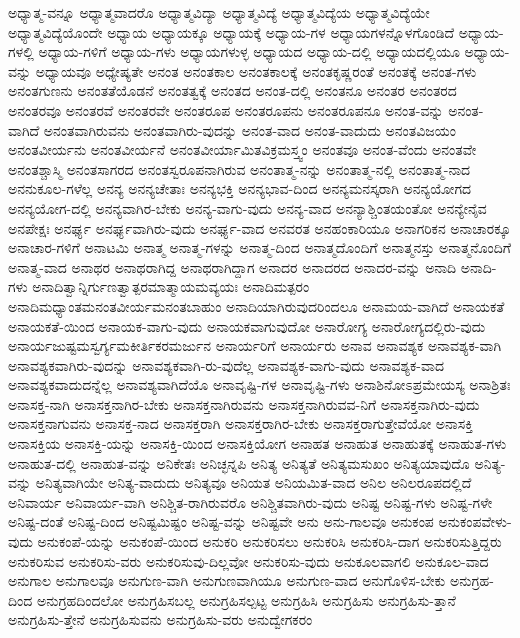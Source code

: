 {ಅಧ್ಯಾತ್ಮ-ವನ್ನೂ
ಅಧ್ಯಾತ್ಮವಾದರೊ
ಅಧ್ಯಾತ್ಮವಿದ್ಯಾ
ಅಧ್ಯಾತ್ಮವಿದ್ಯೆ
ಅಧ್ಯಾತ್ಮವಿದ್ಯೆಯ
ಅಧ್ಯಾತ್ಮವಿದ್ಯೆಯೇ
ಅಧ್ಯಾತ್ಮವಿದ್ಯೆಯೊಂದೇ
ಅಧ್ಯಾಯ
ಅಧ್ಯಾಯಕ್ಕೂ
ಅಧ್ಯಾಯಕ್ಕೆ
ಅಧ್ಯಾಯ-ಗಳ
ಅಧ್ಯಾಯಗಳನ್ನೊಳಗೊಂಡಿದೆ
ಅಧ್ಯಾಯ-ಗಳಲ್ಲಿ
ಅಧ್ಯಾಯ-ಗಳಿಗೆ
ಅಧ್ಯಾಯ-ಗಳು
ಅಧ್ಯಾಯಗಳುಳ್ಳ
ಅಧ್ಯಾಯದ
ಅಧ್ಯಾಯ-ದಲ್ಲಿ
ಅಧ್ಯಾಯದಲ್ಲಿಯೂ
ಅಧ್ಯಾಯ-ವನ್ನು
ಅಧ್ಯಾಯವೂ
ಅಧ್ಯೇಷ್ಯತೇ
ಅನಂತ
ಅನಂತಕಾಲ
ಅನಂತಕಾಲಕ್ಕೆ
ಅನಂತಕೃಷ್ಣರಂತೆ
ಅನಂತಕ್ಕೆ
ಅನಂತ-ಗಳು
ಅನಂತಗುಣನು
ಅನಂತತೆಯೊಡನೆ
ಅನಂತತ್ವಕ್ಕೆ
ಅನಂತದ
ಅನಂತ-ದಲ್ಲಿ
ಅನಂತನೂ
ಅನಂತರ
ಅನಂತರದ
ಅನಂತರವೂ
ಅನಂತರವೆ
ಅನಂತರವೇ
ಅನಂತರೂಪ
ಅನಂತರೂಪನು
ಅನಂತರೂಪನೂ
ಅನಂತ-ವನ್ನು
ಅನಂತ-ವಾಗಿದೆ
ಅನಂತವಾಗಿರುವನು
ಅನಂತವಾಗಿರು-ವುದನ್ನು
ಅನಂತ-ವಾದ
ಅನಂತ-ವಾದುದು
ಅನಂತವಿಜಯಂ
ಅನಂತವೀರ್ಯನು
ಅನಂತವೀರ್ಯನೆ
ಅನಂತವೀರ್ಯಾಮಿತವಿಕ್ರಮಸ್ತ್ವಂ
ಅನಂತವೂ
ಅನಂತ-ವೆಂದು
ಅನಂತವೇ
ಅನಂತಶ್ಚಾಸ್ಮಿ
ಅನಂತಸಾಗರದ
ಅನಂತಸ್ವರೂಪನಾಗಿರುವ
ಅನಂತಾತ್ಮ-ನನ್ನು
ಅನಂತಾತ್ಮ-ನಲ್ಲಿ
ಅನಂತಾತ್ಮ-ನಾದ
ಅನನುಕೂಲ-ಗಳೆಲ್ಲ
ಅನನ್ಯ
ಅನನ್ಯಚೇತಾಃ
ಅನನ್ಯಭಕ್ತಿ
ಅನನ್ಯಭಾವ-ದಿಂದ
ಅನನ್ಯಮನಸ್ಕರಾಗಿ
ಅನನ್ಯಯೋಗದ
ಅನನ್ಯಯೋಗ-ದಲ್ಲಿ
ಅನನ್ಯವಾಗಿರ-ಬೇಕು
ಅನನ್ಯ-ವಾಗು-ವುದು
ಅನನ್ಯ-ವಾದ
ಅನನ್ಯಾಶ್ಚಿಂತಯಂತೋ
ಅನನ್ಯೇನೈವ
ಅನಪೇಕ್ಷಃ
ಅನರ್ಘ್ಯ
ಅನರ್ಘ್ಯವಾಗಿರು-ವುದು
ಅನರ್ಘ್ಯ-ವಾದ
ಅನವರತ
ಅನಹಂಕಾರಿಯೂ
ಅನಾಗರಿಕನ
ಅನಾಚಾರಕ್ಕೂ
ಅನಾಚಾರ-ಗಳಿಗೆ
ಅನಾಟಮಿ
ಅನಾತ್ಮ
ಅನಾತ್ಮ-ಗಳನ್ನು
ಅನಾತ್ಮ-ದಿಂದ
ಅನಾತ್ಮದೊಂದಿಗೆ
ಅನಾತ್ಮನಸ್ತು
ಅನಾತ್ಮನೊಂದಿಗೆ
ಅನಾತ್ಮ-ವಾದ
ಅನಾಥರ
ಅನಾಥರಾಗಿದ್ದ
ಅನಾಥರಾಗಿದ್ದಾಗ
ಅನಾದರ
ಅನಾದರದ
ಅನಾದರ-ವನ್ನು
ಅನಾದಿ
ಅನಾದಿ-ಗಳು
ಅನಾದಿತ್ವಾನ್ನಿರ್ಗುಣತ್ವಾತ್ಪರಮಾತ್ಮಾಯಮವ್ಯಯಃ
ಅನಾದಿಮತ್ಪರಂ
ಅನಾದಿಮಧ್ಯಾಂತಮನಂತವೀರ್ಯಮನಂತಬಾಹುಂ
ಅನಾದಿಯಾಗಿರುವುದರಿಂದಲೂ
ಅನಾಮಯ-ವಾಗಿದೆ
ಅನಾಯಕತೆ
ಅನಾಯಕತೆ-ಯಿಂದ
ಅನಾಯಕ-ವಾಗು-ವುದು
ಅನಾಯಕವಾಗುವುದೋ
ಅನಾರೋಗ್ಯ
ಅನಾರೋಗ್ಯದಲ್ಲಿರು-ವುದು
ಅನಾರ್ಯಜುಷ್ಟಮಸ್ವರ್ಗ್ಯಮಕೀರ್ತಿಕರಮರ್ಜುನ
ಅನಾರ್ಯರಿಗೆ
ಅನಾರ್ಯರು
ಅನಾವ
ಅನಾವಶ್ಯಕ
ಅನಾವಶ್ಯಕ-ವಾಗಿ
ಅನಾವಶ್ಯಕವಾಗಿರು-ವುದನ್ನು
ಅನಾವಶ್ಯಕವಾಗಿ-ರು-ವುದೆಲ್ಲ
ಅನಾವಶ್ಯಕ-ವಾಗು-ವುದು
ಅನಾವಶ್ಯಕ-ವಾದ
ಅನಾವಶ್ಯಕವಾದುದನ್ನೆಲ್ಲ
ಅನಾವಶ್ಯವಾಗಿದೆಯೊ
ಅನಾವೃಷ್ಟಿ-ಗಳ
ಅನಾವೃಷ್ಟಿ-ಗಳು
ಅನಾಶಿನೋಽಪ್ರಮೇಯಸ್ಯ
ಅನಾಶ್ರಿತಃ
ಅನಾಸಕ್ತ-ನಾಗಿ
ಅನಾಸಕ್ತನಾಗಿರ-ಬೇಕು
ಅನಾಸಕ್ತನಾಗಿರುವನು
ಅನಾಸಕ್ತನಾಗಿರುವವ-ನಿಗೆ
ಅನಾಸಕ್ತನಾಗಿರು-ವುದು
ಅನಾಸಕ್ತನಾಗುವನು
ಅನಾಸಕ್ತ-ನಾದ
ಅನಾಸಕ್ತರಾಗಿ
ಅನಾಸಕ್ತರಾಗಿರ-ಬೇಕು
ಅನಾಸಕ್ತರಾಗುತ್ತೇವೆಯೋ
ಅನಾಸಕ್ತಿ
ಅನಾಸಕ್ತಿಯ
ಅನಾಸಕ್ತಿ-ಯನ್ನು
ಅನಾಸಕ್ತಿ-ಯಿಂದ
ಅನಾಸಕ್ತಿಯೋಗ
ಅನಾಹತ
ಅನಾಹುತ
ಅನಾಹುತಕ್ಕೆ
ಅನಾಹುತ-ಗಳು
ಅನಾಹುತ-ದಲ್ಲಿ
ಅನಾಹುತ-ವನ್ನು
ಅನಿಕೇತಃ
ಅನಿಚ್ಛನ್ನಪಿ
ಅನಿತ್ಯ
ಅನಿತ್ಯತೆ
ಅನಿತ್ಯಮಸುಖಂ
ಅನಿತ್ಯಯಾವುದೊ
ಅನಿತ್ಯ-ವನ್ನು
ಅನಿತ್ಯವಾಗಿಯೇ
ಅನಿತ್ಯ-ವಾದುದು
ಅನಿತ್ಯವೂ
ಅನಿಯತ
ಅನಿಯಮಿತ-ವಾದ
ಅನಿಲ
ಅನಿಲರೂಪದಲ್ಲಿದೆ
ಅನಿವಾರ್ಯ
ಅನಿವಾರ್ಯ-ವಾಗಿ
ಅನಿಶ್ಚಿತ-ರಾಗಿರುವರೊ
ಅನಿಶ್ಚಿತವಾಗಿರು-ವುದು
ಅನಿಷ್ಟ
ಅನಿಷ್ಟ-ಗಳು
ಅನಿಷ್ಟ-ಗಳೇ
ಅನಿಷ್ಟ-ದಂತೆ
ಅನಿಷ್ಟ-ದಿಂದ
ಅನಿಷ್ಟಮಿಷ್ಟಂ
ಅನಿಷ್ಟ-ವನ್ನು
ಅನಿಷ್ಟವೇ
ಅನು
ಅನು-ಗಾಲವೂ
ಅನುಕಂಪ
ಅನುಕಂಪವೇಳು-ವುದು
ಅನುಕಂಪೆ-ಯನ್ನು
ಅನುಕಂಪೆ-ಯಿಂದ
ಅನುಕರಿ
ಅನುಕರಿಸಲು
ಅನುಕರಿಸಿ
ಅನುಕರಿಸಿ-ದಾಗ
ಅನುಕರಿಸುತ್ತಿದ್ದರು
ಅನುಕರಿಸುವ
ಅನುಕರಿಸು-ವರು
ಅನುಕರಿಸುವು-ದಿಲ್ಲವೋ
ಅನುಕರಿಸು-ವುದು
ಅನುಕೂಲವಾಗಲಿ
ಅನುಕೂಲ-ವಾದ
ಅನುಗಾಲ
ಅನುಗಾಲವೂ
ಅನುಗುಣ-ವಾಗಿ
ಅನುಗುಣವಾಗಿಯೂ
ಅನುಗುಣ-ವಾದ
ಅನುಗೊಳಿಸ-ಬೇಕು
ಅನುಗ್ರಹ-ದಿಂದ
ಅನುಗ್ರಹದಿಂದಲೋ
ಅನುಗ್ರಹಿಸಬಲ್ಲ
ಅನುಗ್ರಹಿಸಲ್ಪಟ್ಟ
ಅನುಗ್ರಹಿಸಿ
ಅನುಗ್ರಹಿಸು
ಅನುಗ್ರಹಿಸು-ತ್ತಾನೆ
ಅನುಗ್ರಹಿಸು-ತ್ತೇನೆ
ಅನುಗ್ರಹಿಸುವನು
ಅನುಗ್ರಹಿಸು-ವರು
ಅನುದ್ವೇಗಕರಂ
}
